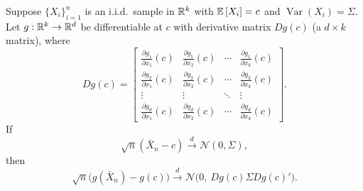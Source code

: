 \begin{theorem}
	Suppose $\{X_i\}_{i=1}^n$ is an i.i.d.\ sample in $\mathbb{R}^k$ with $\mathbb{E}\left[X_i\right]=c$ and $\operatorname{Var}(X_i)=\Sigma$. Let $g:\mathbb{R}^k\to \mathbb{R}^d$ be differentiable at $c$ with derivative matrix $Dg(c)$ (a $d\times k$ matrix), where
	\[
		Dg(c)=
		\begin{bmatrix}
			\frac{\partial g_1}{\partial x_1}(c) & \frac{\partial g_1}{\partial x_2}(c) & \cdots & \frac{\partial g_1}{\partial x_k}(c) \\
			\frac{\partial g_2}{\partial x_1}(c) & \frac{\partial g_2}{\partial x_2}(c) & \cdots & \frac{\partial g_2}{\partial x_k}(c) \\
			\vdots                               & \vdots                               & \ddots & \vdots                               \\
			\frac{\partial g_d}{\partial x_1}(c) & \frac{\partial g_d}{\partial x_2}(c) & \cdots & \frac{\partial g_d}{\partial x_k}(c)
		\end{bmatrix}.
	\]
	If
	\[
		\sqrt{n}(\bar X_n-c)\xrightarrow{d}\mathcal{N}(0,\Sigma),
	\]
	then
	\[
		\sqrt{n}\big(g(\bar X_n)-g(c)\big)\xrightarrow{d}\mathcal{N}\big(0,\ Dg(c)\Sigma Dg(c)'\big).
	\]
\end{theorem}

